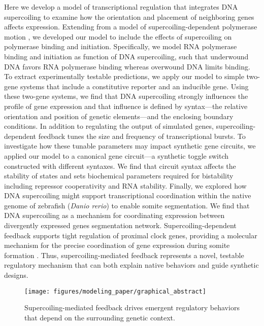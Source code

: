 \documentclass[11pt]{article}
\begin{document}
Here we develop a model of transcriptional regulation that integrates DNA supercoiling to examine how the orientation and placement of neighboring genes affects expression. Extending from a model of supercoiling-dependent polymerase motion \parencite{sevierPropertiesGeneExpression2018}, we developed our model to include the effects of supercoiling on polymerase binding and initiation. Specifically, we model RNA polymerase binding and initiation as function of DNA supercoiling, such that underwound DNA favors RNA polymerase binding whereas overwound DNA limits binding. To extract experimentally testable predictions, we  apply our model to simple two-gene systems that include a constitutive reporter and an inducible gene. Using these two-gene systems, we find that DNA supercoiling strongly influences the profile of gene expression and that influence is defined by syntax---the relative orientation and position of genetic elements---and the enclosing boundary conditions. In addition to regulating the output of simulated genes, supercoiling-dependent feedback tunes the size and frequency of transcriptional bursts. To investigate how these tunable parameters may impact synthetic gene circuits, we applied our model to a canonical gene circuit---a synthetic toggle switch constructed with different syntaxes.
We find that circuit syntax affects the stability of states and sets biochemical parameters required for bistability including repressor cooperativity and RNA stability. Finally, we explored how DNA supercoiling might support transcriptional coordination within the native genome of zebrafish (\textit{Danio rerio}) to enable somite segmentation. We find that DNA supercoiling as a mechanism for coordinating expression between divergently expressed genes segmentation network. Supercoiling-dependent feedback supports tight regulation of proximal clock genes, providing a molecular mechanism for the precise coordination of gene expression during somite formation \parencite{zinaniPairingSegmentationClock2021}. Thus, supercoiling-mediated feedback represents a novel, testable regulatory mechanism that can both explain native behaviors and guide synthetic designs.

\begin{figure}[h]
    \centering
    \texttt{[image: figures/modeling\_paper/graphical\_abstract]}
    \caption{Supercoiling-mediated feedback drives emergent regulatory behaviors that depend on the surrounding genetic context.} \label{fig:graphical_abstract}
\end{figure}
\end{document}
